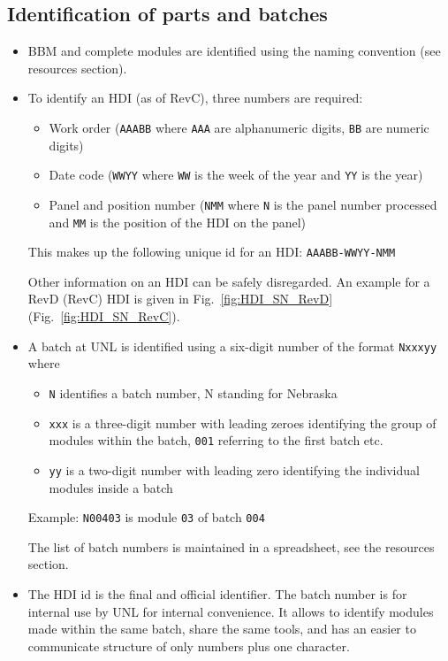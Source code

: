\documentclass[12pt]{unlsilabsop}
\begin{document}
\subsection{Identification of parts and batches}
\begin{itemize}
    \item BBM and complete modules are identified using the naming convention (see resources section).
    \item To identify an HDI (as of RevC), three numbers are required:
    \begin{itemize}
	\item Work order (\texttt{AAABB} where \texttt{AAA} are alphanumeric digits, \texttt{BB} are numeric digits)
	\item Date code (\texttt{WWYY} where \texttt{WW} is the week of the year and \texttt{YY} is the year)
	\item Panel and position number (\texttt{NMM} where \texttt{N} is the panel number processed and \texttt{MM} is the position of the HDI on the panel)
    \end{itemize}
    This makes up the following unique id for an HDI: \texttt{AAABB-WWYY-NMM}

    Other information on an HDI can be safely disregarded. An example for a RevD (RevC) HDI is given in Fig.~\ref{fig:HDI_SN_RevD} (Fig.~\ref{fig:HDI_SN_RevC}).
    \item A batch at UNL is identified using a six-digit number of the format \texttt{Nxxxyy} where
    \begin{itemize}
	\item \texttt{N} identifies a batch number, N standing for Nebraska
	\item \texttt{xxx} is a three-digit number with leading zeroes identifying the group of modules within the batch, \texttt{001} referring to the first batch etc.
	\item \texttt{yy} is a two-digit number with leading zero identifying the individual modules inside a batch
    \end{itemize}
    Example: \texttt{N00403} is module \texttt{03} of batch \texttt{004}

    The list of batch numbers is maintained in a spreadsheet, see the resources section.
    \item The HDI id is the final and official identifier. The batch number is for internal use by UNL for internal convenience. It allows to identify modules made within the same batch, share the same tools, and has an easier to communicate structure of only numbers plus one character.
\end{itemize}
\end{document}
